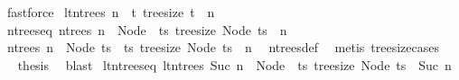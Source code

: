 \begin{isabellebody}
\ fastforce%
\endisatagproof
{\isafoldproof}%
%
\isadelimproof
%
\endisadelimproof
%
\isadelimdocument
%
\endisadelimdocument
%
\isatagdocument
%
\isamarkuptrue%
%
\endisatagdocument
{\isafolddocument}%
%
\isadelimdocument
%
\endisadelimdocument
{}\isamarkupfalse%
\ {\isachardoublequoteopen}lt{\isacharunderscore}{\kern0pt}n{\isacharunderscore}{\kern0pt}trees\ n\ {\isasymequiv}\ {\isacharbraceleft}{\kern0pt}t{\isachardot}{\kern0pt}\ tree{\isacharunderscore}{\kern0pt}size\ t\ {\isasymle}\ n{\isacharbraceright}{\kern0pt}{\isachardoublequoteclose}\isanewline
\isanewline
{}\isamarkupfalse%
\ n{\isacharunderscore}{\kern0pt}trees{\isacharunderscore}{\kern0pt}eq{\isacharcolon}{\kern0pt}\ {\isachardoublequoteopen}n{\isacharunderscore}{\kern0pt}trees\ n\ {\isacharequal}{\kern0pt}\ Node\ {\isacharbackquote}{\kern0pt}\ {\isacharbraceleft}{\kern0pt}ts{\isachardot}{\kern0pt}\ tree{\isacharunderscore}{\kern0pt}size\ {\isacharparenleft}{\kern0pt}Node\ ts{\isacharparenright}{\kern0pt}\ {\isacharequal}{\kern0pt}\ n{\isacharbraceright}{\kern0pt}{\isachardoublequoteclose}\isanewline
%
\isadelimproof
%
\endisadelimproof
%
\isatagproof
{}\isamarkupfalse%
{\isacharminus}{\kern0pt}\isanewline
\ \ \isamarkupfalse%
\ {\isachardoublequoteopen}n{\isacharunderscore}{\kern0pt}trees\ n\ {\isacharequal}{\kern0pt}\ {\isacharbraceleft}{\kern0pt}Node\ ts\ {\isacharbar}{\kern0pt}\ ts{\isachardot}{\kern0pt}\ tree{\isacharunderscore}{\kern0pt}size\ {\isacharparenleft}{\kern0pt}Node\ ts{\isacharparenright}{\kern0pt}\ {\isacharequal}{\kern0pt}\ n{\isacharbraceright}{\kern0pt}{\isachardoublequoteclose}\ \isamarkupfalse%
\ n{\isacharunderscore}{\kern0pt}trees{\isacharunderscore}{\kern0pt}def\ \isamarkupfalse%
\ {\isacharparenleft}{\kern0pt}metis\ tree{\isacharunderscore}{\kern0pt}size{\isachardot}{\kern0pt}cases{\isacharparenright}{\kern0pt}\isanewline
\ \ \isamarkupfalse%
\ \isamarkupfalse%
\ {\isacharquery}{\kern0pt}thesis\ \isamarkupfalse%
\ blast\isanewline
{}\isamarkupfalse%
%
\endisatagproof
{\isafoldproof}%
%
\isadelimproof
\isanewline
%
\endisadelimproof
\isanewline
{}\isamarkupfalse%
\ lt{\isacharunderscore}{\kern0pt}n{\isacharunderscore}{\kern0pt}trees{\isacharunderscore}{\kern0pt}eq{\isacharcolon}{\kern0pt}\ {\isachardoublequoteopen}lt{\isacharunderscore}{\kern0pt}n{\isacharunderscore}{\kern0pt}trees\ {\isacharparenleft}{\kern0pt}Suc\ n{\isacharparenright}{\kern0pt}\ {\isacharequal}{\kern0pt}\ Node\ {\isacharbackquote}{\kern0pt}\ {\isacharbraceleft}{\kern0pt}ts{\isachardot}{\kern0pt}\ tree{\isacharunderscore}{\kern0pt}size\ {\isacharparenleft}{\kern0pt}Node\ ts{\isacharparenright}{\kern0pt}\ {\isasymle}\ Suc\ n{\isacharbraceright}{\kern0pt}{\isachardoublequoteclose}\isanewline

\end{isabellebody}
